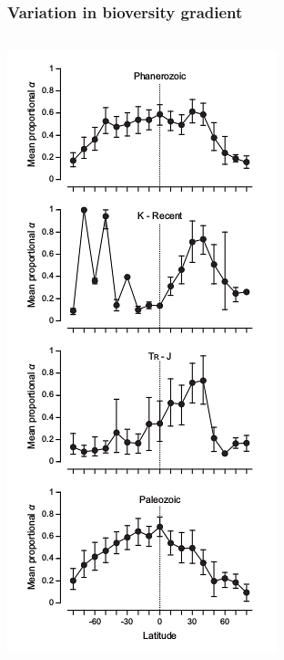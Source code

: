 \documentclass{beamer}
\begin{document}
\begin{frame}
  \frametitle{Variation in bioversity gradient}
  \begin{columns}
    \begin{column}{0.4\textwidth}
      \includegraphics[width=\textwidth,height=0.8\textheight,keepaspectratio=true]{figure/powell_2015_b}

\end{column}
\end{columns}
\end{frame}
\end{document}
